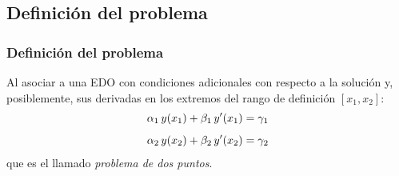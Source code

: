 \subsection{Definición del problema}
\begin{frame}
\frametitle{Definición del problema}
Al asociar a una EDO con condiciones adicionales con respecto a la solución y, posiblemente, sus derivadas en los extremos del rango de definición $[x_{1}, x_{2}]$:
\begin{align}
\alpha_{1} \, y(x_{1}) + \beta_{1} \, {y}^{\prime} (x_{1}) &= \gamma_{1} \label{eq:ecuacion_12_09} \\[0.5em]
\alpha_{2} \, y(x_{2}) + \beta_{2} \, {y}^{\prime} (x_{2}) &= \gamma_{2} \label{eq:ecuacion_12_10}
\end{align}
que es el llamado \emph{problema de dos puntos}.
\end{frame}
